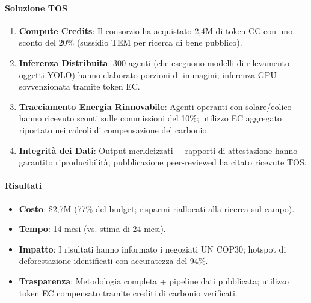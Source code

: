 \documentclass[11pt]{article}
\begin{document}
\begin{itemize}[noitemsep]
\paragraph{Soluzione TOS}
\begin{enumerate}[noitemsep]
  \item \textbf{Compute Credits}: Il consorzio ha acquistato 2,4M di token CC con uno sconto del 20\% (sussidio TEM per ricerca di bene pubblico).
  \item \textbf{Inferenza Distribuita}: 300 agenti (che eseguono modelli di rilevamento oggetti YOLO) hanno elaborato porzioni di immagini; inferenza GPU sovvenzionata tramite token EC.
  \item \textbf{Tracciamento Energia Rinnovabile}: Agenti operanti con solare/eolico hanno ricevuto sconti sulle commissioni del 10\%; utilizzo EC aggregato riportato nei calcoli di compensazione del carbonio.
  \item \textbf{Integrità dei Dati}: Output merkleizzati + rapporti di attestazione hanno garantito riproducibilità; pubblicazione peer-reviewed ha citato ricevute TOS.
\end{enumerate}

\paragraph{Risultati}
\begin{itemize}[noitemsep]
  \item \textbf{Costo}: \$2,7M (77\% del budget; risparmi riallocati alla ricerca sul campo).
  \item \textbf{Tempo}: 14 mesi (vs. stima di 24 mesi).
  \item \textbf{Impatto}: I risultati hanno informato i negoziati UN COP30; hotspot di deforestazione identificati con accuratezza del 94\%.
  \item \textbf{Trasparenza}: Metodologia completa + pipeline dati pubblicata; utilizzo token EC compensato tramite crediti di carbonio verificati.
\end{itemize}


\end{itemize}
\end{document}

